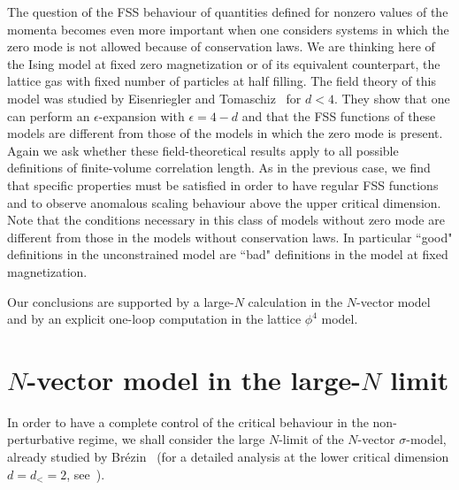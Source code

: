 \documentclass[12pt]{article}
\begin{document}
The question of the FSS behaviour of quantities defined for 
nonzero values of the momenta becomes even more important 
when one considers systems in which the zero mode is not allowed 
because of conservation laws. We are thinking here of the Ising
model at fixed zero magnetization or of its equivalent counterpart, 
the lattice gas with fixed number of particles at half filling. 
The field theory of this model was studied
by Eisenriegler and Tomaschiz~\cite{Eisenriegler}
for $d<4$. They show that one can perform an $\epsilon$-expansion
with $\epsilon = 4-d$ and that the FSS functions of these models
are different from those of the models in which the zero mode is present.
Again we ask whether these field-theoretical results apply to all 
possible definitions of finite-volume correlation length.
As in the previous case, we find that specific properties must be satisfied in 
order to have regular FSS functions and to observe anomalous scaling behaviour
above the upper critical dimension. Note that the conditions 
necessary in this class of models without zero mode are different from 
those in the models without conservation laws. In particular 
``good" definitions in the unconstrained model are ``bad" definitions 
in the model at fixed magnetization.

Our conclusions are supported by a large-$N$ calculation in the 
$N$-vector model and by an explicit one-loop computation in the lattice 
$\phi^4$ model.

\section{$N$-vector model in the large-$N$ limit}

In order to have a complete control of the critical behaviour in the
non-perturbative regime, we shall consider the large $N$-limit of
the $N$-vector $\sigma$-model,  already studied by
Br\'ezin~\cite{Brezin82} (for a detailed analysis at the
lower critical dimension $d=d_<=2$, see~\cite{Caracciolo98}).
\end{document}
